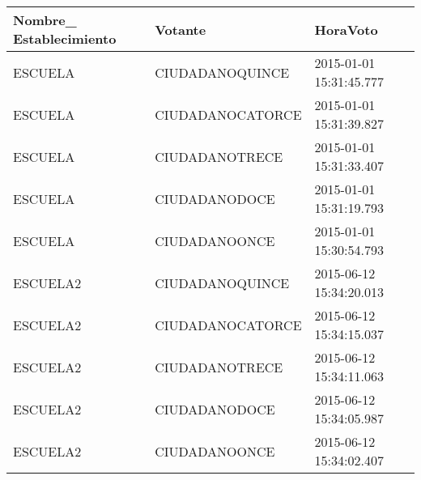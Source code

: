 \begin{itemize}
 \begin{tabular}{| l| l| l|}
	\hline 
	    Nombre\_ Establecimiento & Votante & HoraVoto \\
	  \hline 
	   ESCUELA &CIUDADANOQUINCE & 2015-01-01 15:31:45.777 \\
	   \hline 
	   ESCUELA &CIUDADANOCATORCE & 2015-01-01 15:31:39.827 \\
	   \hline 
	   ESCUELA &CIUDADANOTRECE & 2015-01-01 15:31:33.407 \\
	   \hline 
	  ESCUELA  & CIUDADANODOCE & 2015-01-01 15:31:19.793\\
	   \hline 
	   ESCUELA  & CIUDADANOONCE & 2015-01-01 15:30:54.793\\
	   \hline 
	   ESCUELA2 &CIUDADANOQUINCE & 2015-06-12 15:34:20.013 \\
	   \hline 
	   ESCUELA2 &CIUDADANOCATORCE & 2015-06-12 15:34:15.037 \\
	   \hline 
	   ESCUELA2  & CIUDADANOTRECE &2015-06-12 15:34:11.063 \\
	   \hline 
	   ESCUELA2  & CIUDADANODOCE &2015-06-12 15:34:05.987 \\
	   \hline 
	   ESCUELA2  & CIUDADANOONCE &2015-06-12 15:34:02.407 \\
	   \hline 
	\end{tabular}

\end{itemize}